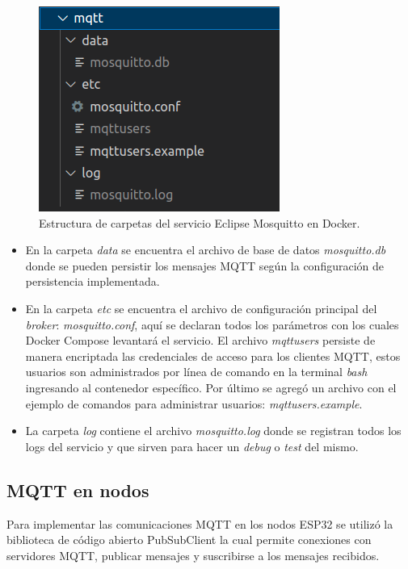 \begin{figure}[H]
	\centering
	\includegraphics[scale=.60]{./Figures/mqtt-estructura-carpetas.png}
	\caption{Estructura de carpetas del servicio Eclipse Mosquitto en Docker.}
	\label{fig:mqttestructuracarpetas}
\end{figure}

\begin{itemize}
	\item En la carpeta \textit{data} se encuentra el archivo de base de datos \textit{mosquitto.db} donde se pueden persistir los mensajes MQTT según la configuración de persistencia implementada.
	\item En la carpeta \textit{etc} se encuentra el archivo de configuración principal del \textit{broker}: \textit{mosquitto.conf}, aquí se declaran todos los parámetros con los cuales Docker Compose levantará el servicio. El archivo \textit{mqttusers} persiste de manera encriptada las credenciales de acceso para los clientes MQTT, estos usuarios son administrados por línea de comando en la terminal \textit{bash} ingresando al contenedor específico. Por último se agregó un archivo con el ejemplo de comandos para administrar usuarios: \textit{mqttusers.example}.
	\item La carpeta \textit{log} contiene el archivo \textit{mosquitto.log} donde se registran todos los logs del servicio y que sirven para hacer un \textit{debug} o \textit{test} del mismo.	
\end{itemize}


\subsection{MQTT en nodos}
\label{subsec:mqttnodos}
Para implementar las comunicaciones MQTT en los nodos ESP32 se utilizó la biblioteca de código abierto PubSubClient \citep{WEBSITE:pubsubclient} la cual permite conexiones con servidores MQTT, publicar mensajes y suscribirse a los mensajes recibidos.

